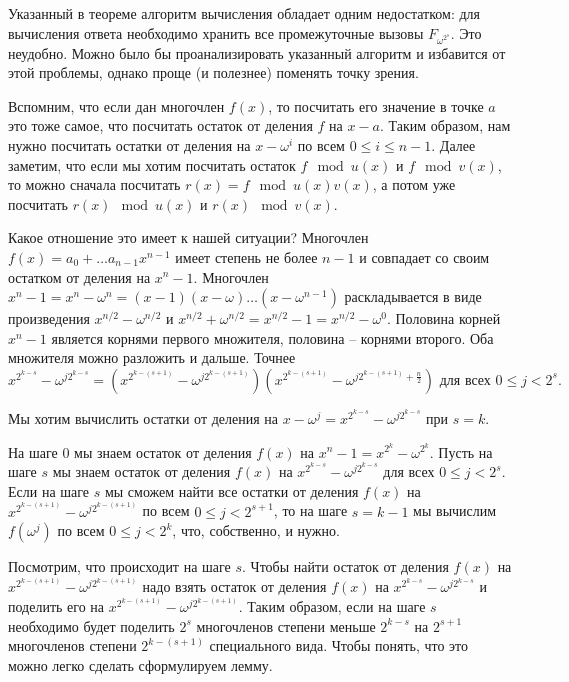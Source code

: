 Указанный в теореме алгоритм вычисления обладает одним недостатком: для вычисления ответа необходимо хранить все промежуточные вызовы $F_{\omega^{2^s}}$. Это неудобно. Можно было бы проанализировать указанный алгоритм и избавится от этой проблемы, однако проще (и полезнее) поменять точку зрения.



Вспомним, что если дан многочлен $f(x)$, то посчитать его значение в точке $a$ это тоже самое, что посчитать остаток от деления $f$ на $x-a$. Таким образом, нам нужно посчитать остатки от деления на $x-\omega^i$ по всем $0\leq i\leq n-1$. 
Далее заметим, что если мы хотим посчитать остаток $f \mod u(x)$ и $f \mod v(x)$, то можно сначала посчитать $r(x)=f\mod u(x)v(x)$, а потом уже посчитать $r(x) \mod u(x)$ и $r(x) \mod v(x)$.

Какое отношение это имеет к нашей ситуации? Многочлен $f(x)=a_0+\dots a_{n-1}x^{n-1}$ имеет степень не более $n-1$ и совпадает со своим остатком от деления на $x^n-1$. Многочлен $x^n-1=x^n-\omega^n=(x-1)(x-\omega)\dots(x-\omega^{n-1})$ раскладывается в виде произведения $x^{n/2}-\omega^{n/2}$ и $x^{n/2}+\omega^{n/2}=x^{n/2}-1=x^{n/2}-\omega^0$. Половина корней $x^n-1$ является корнями первого множителя, половина -- корнями второго. Оба множителя можно разложить и дальше.
Точнее $$x^{2^{k-s}}-\omega^{j2^{k-s}}=(x^{2^{k-(s+1)}}-\omega^{j2^{k-(s+1)}})(x^{2^{k-(s+1)}}-\omega^{j2^{k-(s+1)}+\frac{n}{2}})  \text{ для всех } 0\leq j< 2^s.$$ 

Мы хотим вычислить остатки от деления на $x-\omega^j=x^{2^{k-s}}-\omega^{j2^{k-s}}$ при  $s=k$.

На шаге $0$ мы знаем остаток от деления $f(x)$ на $x^n-1=x^{2^k}-\omega^{2^k}$. Пусть на шаге $s$ мы знаем остаток от деления $f(x)$  на $x^{2^{k-s}}-\omega^{j2^{k-s}}$ для всех $0\leq j< 2^s$. Если на шаге $s$ мы сможем найти все остатки от деления $f(x)$ на  $x^{2^{k-(s+1)}}-\omega^{j2^{k-(s+1)}}$ по всем $0\leq j< 2^{s+1}$, то на шаге $s=k-1$ мы вычислим $f(\omega^j)$ по всем $0\leq j <2^k$, что, собственно, и нужно.

Посмотрим, что происходит на шаге $s$. Чтобы найти остаток от деления $f(x)$ на $x^{2^{k-(s+1)}}-\omega^{j2^{k-(s+1)}}$ надо взять остаток от деления  $f(x)$ на $x^{2^{k-s}}-\omega^{j2^{k-s}}$ и поделить его на $x^{2^{k-(s+1)}}-\omega^{j2^{k-(s+1)}}$. Таким образом, если на шаге $s$ необходимо будет поделить $2^s$ многочленов степени меньше $2^{k-s}$ на $2^{s+1}$ многочленов степени $2^{k-(s+1)}$ специального вида. Чтобы понять, что это можно легко сделать сформулируем лемму.


